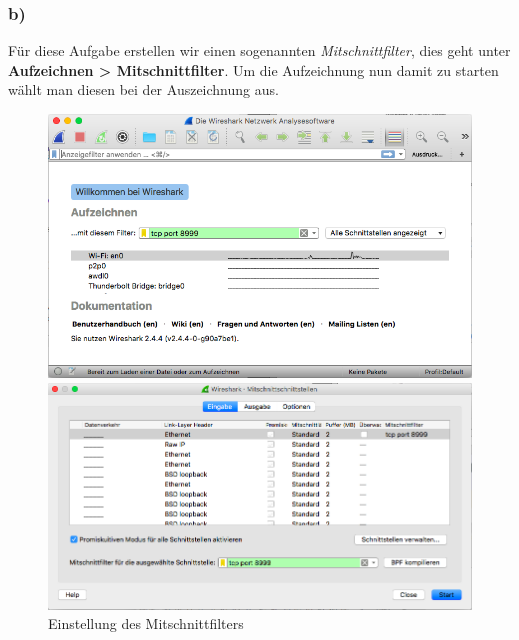 \subsubsection{b)}
Für diese Aufgabe erstellen wir einen sogenannten \textit{Mitschnittfilter}, dies geht unter \textbf{Aufzeichnen > Mitschnittfilter}. Um die Aufzeichnung nun damit zu starten wählt man diesen bei der Auszeichnung aus. 
\begin{figure}[H]
	\begin{minipage}[b]{.5 \linewidth}
		\centering
		\includegraphics[width=.95 \linewidth]{images/w03}
	\end{minipage}
	\begin{minipage}[b]{.5 \linewidth}
		\centering
		\includegraphics[width=.95 \linewidth]{images/w04}
	\end{minipage}
	\caption{Einstellung des Mitschnittfilters}
\end{figure}

